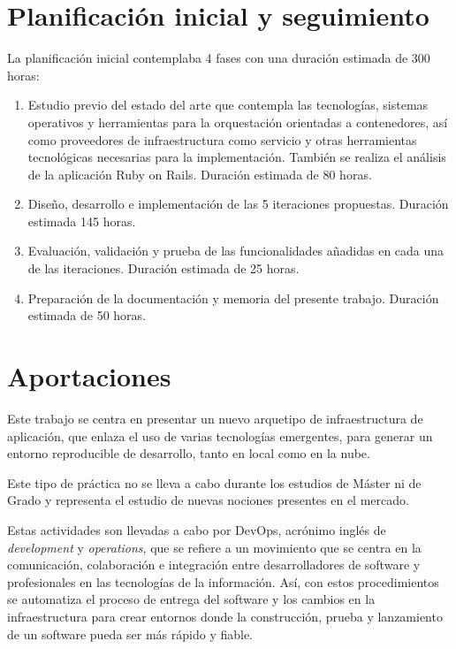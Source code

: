 \section{Planificación inicial y seguimiento}

La planificación inicial contemplaba 4 fases con una duración estimada de 300 horas:
\begin{enumerate}
\item Estudio previo del estado del arte que contempla las tecnologías, sistemas operativos y herramientas para la orquestación orientadas a contenedores, así como proveedores de infraestructura como servicio y otras herramientas tecnológicas necesarias para la implementación. También se realiza el análisis de la aplicación Ruby on Rails. Duración estimada de 80 horas.
\item Diseño, desarrollo e implementación de las 5 iteraciones propuestas. Duración estimada 145 horas.
\item Evaluación, validación y prueba de las funcionalidades añadidas en cada una de las iteraciones. Duración estimada de 25 horas.
\item Preparación de la documentación y memoria del presente trabajo. Duración estimada de 50 horas.
\end{enumerate}

\section{Aportaciones}

Este trabajo se centra en presentar un nuevo arquetipo de infraestructura de aplicación, que enlaza el uso de varias tecnologías emergentes, para generar un entorno reproducible de desarrollo, tanto en local como en la nube. 

Este tipo de práctica no se lleva a cabo durante los estudios de Máster ni de Grado y representa el estudio de nuevas nociones presentes en el mercado. 

Estas actividades son llevadas a cabo por DevOps, acrónimo inglés de \textit{development} y \textit{operations}, que se refiere a un movimiento que se centra en la comunicación, colaboración e integración entre desarrolladores de software y profesionales en las tecnologías de la información. Así, con estos procedimientos se automatiza el proceso de entrega del software y los cambios en la infraestructura para crear entornos donde la construcción, prueba y lanzamiento de un software pueda ser más rápido y fiable. 

